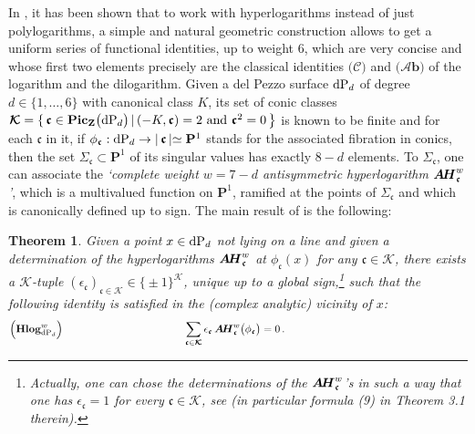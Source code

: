 \documentclass[11pt]{amsart}
\newtheorem*{thm*}{Theorem}
\begin{document}
 In \cite{CP}, it has been  shown that to work with hyperlogarithms instead of just polylogarithms, a simple and natural geometric construction allows to get a uniform series of functional identities, up to weight 6, which are very concise and whose first two elements precisely are the classical identities  $\boldsymbol{\big(\mathcal C\big)}$ and $\boldsymbol{\big(\mathcal Ab\big)}$ of the logarithm and the dilogarithm. 
Given a del Pezzo surface ${\rm dP}_d$ of degree $d\in \{1,\ldots,6\}$ with canonical class 
$K$, its set of conic classes $\boldsymbol{\mathcal K}=\{ \, \boldsymbol{\mathfrak c} \in {\bf Pic}_{\mathbf Z}\big( {\rm dP}_d\big)\, \lvert 
\, (-K,\boldsymbol{\mathfrak c})=2 \mbox{ and } \boldsymbol{\mathfrak c}^2=0\,\big\}$ is known to be finite and for each 
$\boldsymbol{\mathfrak c}$ in it, if $\phi_{\boldsymbol{\mathfrak c}}: {\rm dP}_d\rightarrow 
\lvert \,\boldsymbol{\mathfrak c}\, \lvert \simeq \mathbf P^1$ stands for the associated fibration in conics, then the set $\Sigma_{\boldsymbol{\mathfrak c}}\subset \mathbf P^1$ of its singular values has exactly  $8-d$ elements.  To $\Sigma_{\boldsymbol{\mathfrak c}}$, 
one can associate the {\it `complete weight $w=7-d$ antisymmetric hyperlogarithm $\boldsymbol{A\hspace{-0.05cm}H}^w_{\boldsymbol{\mathfrak c}}$'}, which is a multivalued function on $\mathbf P^1$, ramified at the points of $\Sigma_{\boldsymbol{\mathfrak c}}$ and which is canonically defined up to sign. 
The main result of \cite{CP} is the following: 
\begin{thm*} Given a point $x\in {\rm dP}_d$ not lying on a line and given 
a determination of the hyperlogarithms $
\boldsymbol{A\hspace{-0.05cm}H}^w_{\boldsymbol{\mathfrak c}}$
 at $\phi_{\boldsymbol{\mathfrak c}}(x)$ for any  ${\boldsymbol{\mathfrak c}} \in \boldsymbol{\mathcal K}$,  
 there exists a $\boldsymbol{\mathcal K}$-tuple   $(\epsilon_{\boldsymbol{\mathfrak c}})
_{ \boldsymbol{\mathfrak c} \in  \boldsymbol{\mathcal K} }
\in \big\{ \pm1 \big\}^ {\boldsymbol{\mathcal K}}$, unique up to a global sign,\footnote{Actually, one can chose the determinations of the $
\boldsymbol{A\hspace{-0.05cm}H}^w_{\boldsymbol{\mathfrak c}}$'s in such a way that one has 
$\epsilon_{\boldsymbol{\mathfrak c}}=1$ for every ${\boldsymbol{\mathfrak c}} \in \boldsymbol{\mathcal K}$, see \cite{CP} (in particular formula (9) in Theorem 3.1 therein).} such that the following identity is satisfied in the (complex analytic) vicinity of $x$: 
$$
\Big({\bf Hlog}^{w}_{ {\rm dP}_d}\Big)
\hspace{4cm}
\sum_{ 
\boldsymbol{\mathfrak c} \in 
\boldsymbol{\mathcal K}
}
\epsilon_{\boldsymbol{\mathfrak c}}\, 
\boldsymbol{A\hspace{-0.05cm}H}^w_{\boldsymbol{\mathfrak c}}
\big( \phi_{\boldsymbol{\mathfrak c}} \big)
=0\,. 
\hspace{6cm} {}^{}
$$
\end{thm*}
\end{document}
